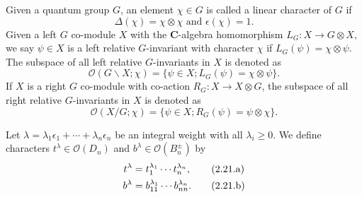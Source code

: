 \documentclass[table,a4paper,reqno]{amsart}
\numberwithin{equation}{section}
\theoremstyle{definition}
\begin{document}
Given a quantum group $G$, an element $\chi\in G$ is called a linear character of $G$ if
\begin{equation*}
    \Delta(\chi)=\chi\otimes\chi\text{ and }\epsilon(\chi)=1.
\end{equation*}
Given a left $G$ co-module $X$ with the $\mathbf{C}$-algebra homomorphism $L_G:X\rightarrow G\otimes X$, we say $\psi\in X$ is a left relative $G$-invariant with character $\chi$ if $L_G(\psi)=\chi\otimes\psi$. The subspace of all left relative $G$-invariants in $X$ is denoted as
\begin{equation*}
    \mathcal{O}(G\backslash X;\chi)=\{\psi\in X;L_G(\psi)=\chi\otimes\psi\}.
\end{equation*}
If $X$ is a right $G$ co-module with co-action $R_G:X\rightarrow X\otimes G$, the subspace of all right relative $G$-invariants in $X$ is denoted as
\begin{equation*}
    \mathcal{O}(X/G;\chi)=\{\psi\in X;R_G(\psi)=\psi\otimes\chi\}.
\end{equation*}

Let $\lambda=\lambda_1\epsilon_1+\cdots+\lambda_n\epsilon_n$ be an integral weight with all $\lambda_i\ge 0$. We define characters $t^\lambda\in \mathcal{O}(D_n)$ and $b^\lambda\in \mathcal{O}(B_n^\pm)$ by
\begin{align}\stepcounter{equation}
    t^\lambda&=t_{1}^{\lambda_1}\cdots t_{n}^{\lambda_n},\tag{2.21.a}\label{eq:2.22.a}\\
    b^\lambda&=b_{11}^{\lambda_1}\cdots b_{nn}^{\lambda_n}.\tag{2.21.b}\label{eq:2.22.b}
\end{align}
\end{document}
